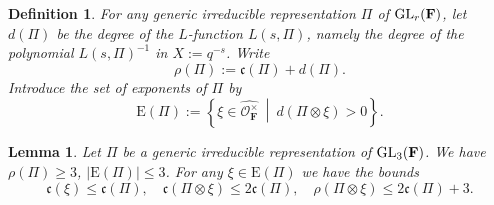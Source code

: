 \documentclass[A4]{amsart}
\def\leq{\leqslant}
\def\geq{\geqslant}
\newtheorem{definition} [theorem] {Definition}
\newtheorem{lemma}      [theorem]{Lemma}
\numberwithin{equation}{section} \everymath{\displaystyle}
\newcommand{\GL}{{\rm GL}}
\newcommand{\F}{\mathbf{F}}
\newcommand{\vO}{\mathcal{O}}
\newcommand{\extnorm}[1]{\left\lvert #1 \right\rvert}
\newcommand{\cond}{\mathfrak{c}}
\newcommand{\condL}{\mathfrak{\rho}}
\begin{document}
\begin{definition} \label{def: ExpChar}
	For any generic irreducible representation $\Pi$ of $\GL_r(\F)$, let $d(\Pi)$ be the degree of the $L$-function $L(s,\Pi)$, namely the degree of the polynomial $L(s,\Pi)^{-1}$ in $X:=q^{-s}$. Write
	$$ \condL(\Pi) := \cond(\Pi)+d(\Pi). $$
	Introduce the set of \emph{exponents} of $\Pi$ by
	$$ \mathrm{E}(\Pi) := \left\{ \xi \in \widehat{\vO_{\F}^{\times}} \ \middle| \ d(\Pi \otimes \xi) > 0 \right\}. $$
\end{definition}
\begin{lemma} \label{lem: ExpCharBds}
	Let $\Pi$ be a generic irreducible representation of $\GL_3(\F)$. We have $\condL(\Pi) \geq 3$, $\extnorm{\mathrm{E}(\Pi)} \leq 3$. For any $\xi \in \mathrm{E}(\Pi)$ we have the bounds 
	$$ \cond(\xi) \leq \cond(\Pi), \quad \cond(\Pi \otimes \xi) \leq 2 \cond(\Pi), \quad \condL(\Pi \otimes \xi) \leq 2 \cond(\Pi)+3. $$
\end{lemma}
\end{document}
